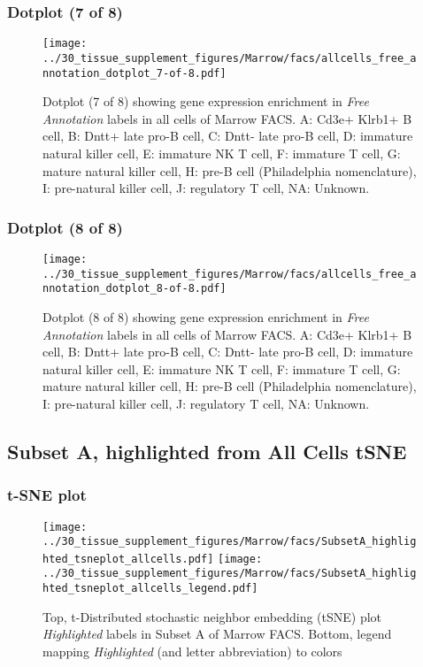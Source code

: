 \clearpage

\subsubsection{Dotplot (7 of 8)}
\begin{figure}[h]
\centering
\texttt{[image: ../30\_tissue\_supplement\_figures/Marrow/facs/allcells\_free\_annotation\_dotplot\_7-of-8.pdf]}

\caption{ Dotplot (7 of 8)  showing gene expression enrichment in \emph{Free Annotation} labels in all cells of Marrow FACS. A: Cd3e+ Klrb1+ B cell, B: Dntt+ late pro-B cell, C: Dntt- late pro-B cell, D: immature natural killer cell, E: immature NK T cell, F: immature T cell, G: mature natural killer cell, H: pre-B cell (Philadelphia nomenclature), I: pre-natural killer cell, J: regulatory T cell, NA: Unknown.}
\end{figure}


\clearpage

\subsubsection{Dotplot (8 of 8)}
\begin{figure}[h]
\centering
\texttt{[image: ../30\_tissue\_supplement\_figures/Marrow/facs/allcells\_free\_annotation\_dotplot\_8-of-8.pdf]}

\caption{ Dotplot (8 of 8)  showing gene expression enrichment in \emph{Free Annotation} labels in all cells of Marrow FACS. A: Cd3e+ Klrb1+ B cell, B: Dntt+ late pro-B cell, C: Dntt- late pro-B cell, D: immature natural killer cell, E: immature NK T cell, F: immature T cell, G: mature natural killer cell, H: pre-B cell (Philadelphia nomenclature), I: pre-natural killer cell, J: regulatory T cell, NA: Unknown.}
\end{figure}


\clearpage
\subsection{Subset A, highlighted from All Cells tSNE}
\subsubsection{t-SNE plot}
\begin{figure}[h]
\centering
\texttt{[image: ../30\_tissue\_supplement\_figures/Marrow/facs/SubsetA\_highlighted\_tsneplot\_allcells.pdf]}
\texttt{[image: ../30\_tissue\_supplement\_figures/Marrow/facs/SubsetA\_highlighted\_tsneplot\_allcells\_legend.pdf]}
\caption{Top, t-Distributed stochastic neighbor embedding (tSNE) plot  \emph{Highlighted} labels in Subset A of Marrow FACS. Bottom, legend mapping \emph{Highlighted} (and letter abbreviation) to colors}
\end{figure}


